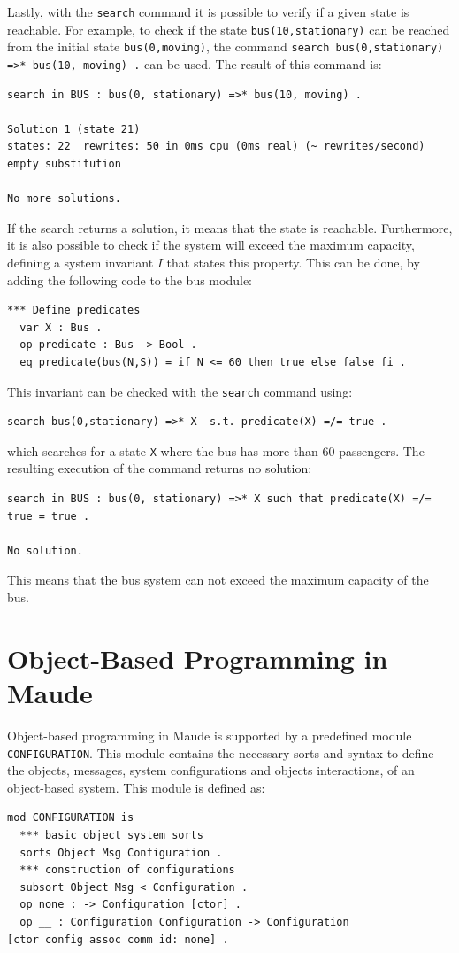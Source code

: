 Lastly, with the \texttt{search} command it is possible to verify if a given state is reachable. For example, to check if the state \texttt{bus(10,stationary)} can be reached from the initial state \texttt{bus(0,moving)}, the command \texttt{search bus(0,stationary) =>* bus(10, moving) .}  can be used. The result of this command is:
\begin{lstlisting}
search in BUS : bus(0, stationary) =>* bus(10, moving) .

Solution 1 (state 21)
states: 22  rewrites: 50 in 0ms cpu (0ms real) (~ rewrites/second)
empty substitution

No more solutions.
\end{lstlisting}
If the search returns a solution, it means that the state is reachable. Furthermore, it is also possible to check if the system will exceed the maximum capacity, defining a system invariant $I$ that states this property. This can be done, by adding the following code to the bus module:
\begin{lstlisting}
*** Define predicates
  var X : Bus .
  op predicate : Bus -> Bool .
  eq predicate(bus(N,S)) = if N <= 60 then true else false fi .
\end{lstlisting}
This invariant can be checked with the \texttt{search} command using:
\begin{lstlisting}
search bus(0,stationary) =>* X  s.t. predicate(X) =/= true .
\end{lstlisting}
which searches for a state \texttt{X} where the bus has more than 60 passengers. The resulting execution of the command returns no solution:
\begin{lstlisting}
search in BUS : bus(0, stationary) =>* X such that predicate(X) =/= true = true .

No solution.
\end{lstlisting}
This means that the bus system can not exceed the maximum capacity of the bus.
\section{Object-Based Programming in Maude}
Object-based programming in Maude \cite{MaudeManual, Lecture3, PeterMaude} is supported by a predefined module \texttt{CONFIGURATION}. This module contains the necessary sorts and syntax to define the objects, messages, system configurations and objects interactions, of an object-based system. This module is defined as:
\begin{lstlisting}
mod CONFIGURATION is
  *** basic object system sorts
  sorts Object Msg Configuration .
  *** construction of configurations
  subsort Object Msg < Configuration .
  op none : -> Configuration [ctor] .
  op __ : Configuration Configuration -> Configuration
[ctor config assoc comm id: none] .
\end{lstlisting}

